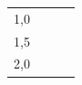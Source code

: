 {{\begin{center}
\begin{tabular}[t]{|l|l|l|l|}
        1,0 &
    
    
         &
    
    
         &
    
    
     \tabularnewline\cline{1-1}\cline{2-2}\cline{3-3}\cline{4-4}
    
    
        1,5 &
    
    
         &
    
    
         &
    
    
     \tabularnewline\cline{1-1}\cline{2-2}\cline{3-3}\cline{4-4}
    
    
        2,0 &
    

\end{tabular}
\end{center}}}
